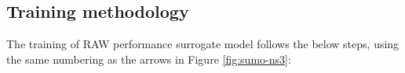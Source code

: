  





\subsection{Training methodology \label{subs:raw_training}}


The training of RAW performance surrogate model follows the below steps, using the same numbering as the arrows in Figure \ref{fig:sumo-ns3}:

